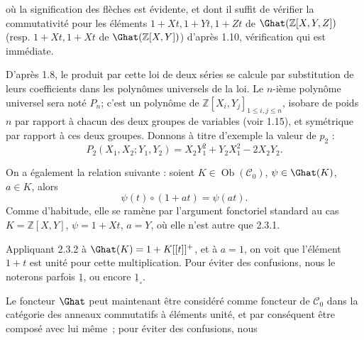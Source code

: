 où la
signification des flèches est évidente, et dont il suffit de vérifier la commutativité pour les éléments \(1+Xt,1+Yt,1+Zt\) de \(\Ghat(\mathbb Z[X,Y,Z])\) (resp. \(1+Xt,1+Xt\) de \(\Ghat(\mathbb Z[X,Y])\)) d'après 1.10, vérification qui est immédiate.

D'après 1.8, le produit par cette loi de deux séries se calcule par substitution de leurs coefficients dans les polynômes universels de la loi. Le \(n\)-ième polynôme universel sera noté \(P_n\); c'est un polynôme de \(\mathbb Z[X_i,Y_j]_{1\leq i,j\leq n}\), isobare de poids \(n\) par rapport à chacun des deux groupes de variables (voir 1.15), et symétrique par rapport à ces deux groupes. Donnons à titre d'exemple la valeur de \(p_2\) :
\[
  P_2(X_1,X_2;Y_1,Y_2)=X_2Y_1^2+Y_2X_1^2-2X_2Y_2.
\]

On a également la relation suivante : soient \(K\in\operatorname{Ob}(\mathcal C_0)\), \(\psi\in\Ghat(K)\), \(a\in K\), alors
\begin{equation}\tag{2.3.2}
  \psi(t)\circ(1+at)=\psi(at).
\end{equation}
Comme d'habitude, elle se ramène par l'argument fonctoriel standard au cas \(K=\mathbb Z[X,Y]\), \(\psi=1+Xt\), \(a=Y\), où elle n'est autre que 2.3.1.

Appliquant 2.3.2 à \(\Ghat(K)=1+K[[t]]^+\), et à \(a=1\), on voit que l'élément \(1+t\) est unité pour cette multiplication. Pour éviter des confusions, nous le noterons parfois \(\underline{1}\), ou encore \(\underline{1}_\circ\).

Le foncteur \(\Ghat\) peut maintenant être considéré comme foncteur de \(\mathcal C_0\) dans la catégorie des anneaux commutatifs à éléments unité, et par conséquent être composé avec lui même~; pour éviter des confusions,
nous 
